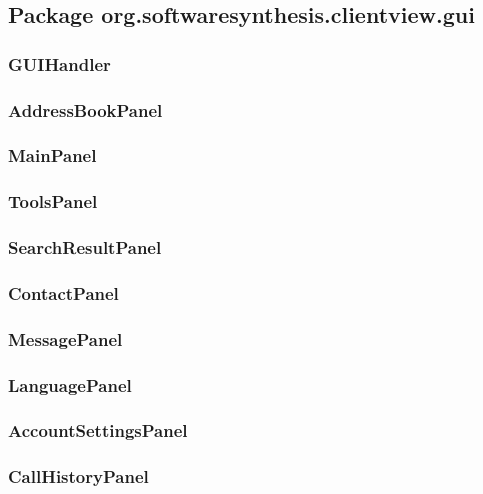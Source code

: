 \subsection{Package org.softwaresynthesis.clientview.gui}

\subsubsection{GUIHandler}

\subsubsection{AddressBookPanel}

\subsubsection{MainPanel}

\subsubsection{ToolsPanel}

\subsubsection{SearchResultPanel}

\subsubsection{ContactPanel}

\subsubsection{MessagePanel}

\subsubsection{LanguagePanel}

\subsubsection{AccountSettingsPanel}

\subsubsection{CallHistoryPanel}


